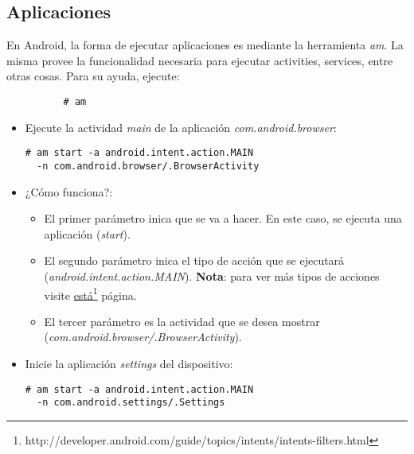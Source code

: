 \subsection{Aplicaciones}
En Android, la forma de ejecutar aplicaciones es mediante la herramienta \textit{am}. La misma provee la funcionalidad necesaria para ejecutar activities, services, entre otras cosas.
Para su ayuda, ejecute:
\begin{lstlisting}
          # am
\end{lstlisting}

\begin{itemize}
    \item Ejecute la actividad \textit{main} de la aplicación \emph{com.android.browser}:
    \begin{lstlisting}
# am start -a android.intent.action.MAIN 
  -n com.android.browser/.BrowserActivity
    \end{lstlisting}
    \item ¿Cómo funciona?:
    \begin{itemize}
  \item El primer parámetro inica que se va a hacer. En este caso, se ejecuta una aplicación (\emph{start}).
  
  \item El segundo parámetro inica el tipo de acción que se ejecutará (\emph{android.intent.action.MAIN}). \textbf{Nota}: para ver más tipos de acciones visite \href{http://developer.android.com/guide/topics/intents/intents-filters.html}{está}\footnote{http://developer.android.com/guide/topics/intents/intents-filters.html} página.
  
  \item El tercer parámetro es la actividad que se desea mostrar 
  (\emph{com.android.browser/.BrowserActivity}).
    \end{itemize}

    \item Inicie la aplicación \emph{settings} del dispositivo:
    \begin{lstlisting}
# am start -a android.intent.action.MAIN 
  -n com.android.settings/.Settings
    \end{lstlisting}
\end{itemize}

